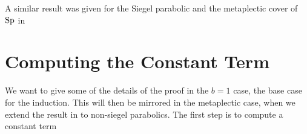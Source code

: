 \begin{Theorem}[]
    
\end{Theorem}

A similar result was given for the Siegel parabolic and the metaplectic cover of \(\operatorname{Sp}\) in \cite{ginzburgTopFourierCoefficients2021}
\begin{Theorem}[]
    
\end{Theorem}

\begin{comment}
    \section{Our Results}
We consider an almost identical setup but we deal with the metaplectic cover of \(\Sp_{2n}\), again over a number field \(F\), \(\Mp_{2n}\)\todo[inline]{reference the section I discuss this in.}. We again fix the Borel of upper triangular matricies, consider partitions of \(n = r+m\) and look at maximal standard parabolics of \(\Sp_{2n}\), \(P_r = M_rN_r\) such that 
\[M_r = \GL_r \times \Sp_{2m}\]
then if \(r = ab\) we still have that \(\Delta(\tau, b)\tensor \sigma\), for \(\tau\) irreducible unitary cuspidal automorphic representation of \(\GL_a\) and \(\sigma\) irreducible generic cuspidal automorphic representation of \(\Sp_{2m}\), is a representation of \(M_r\). The difference is in the parabolic induction as we now consider 
\[\phi\in \mathcal{A}(N_r(\A)M_r(F)\setminus \Mp_{2n}(\A) )_{\Delta(\tau, b)\tensor \sigma}\] 
and then the Eisenstein series is defined in the same way
\[E(\phi, s)(g) = \sum_{\gamma\in P_r(F) \setminus \Sp_{2n}(F)} s.\phi(\gamma g)\]
for \(g\in \Sp_{2n}(F) \setminus \Mp_{2n}(\A)\) and \(s\in \C \cong X^{\Mp_{2n}}_{M_r}\).

\begin{Lemma}
When \(b = 1\) we have the constant term
    \[E(\phi,s)(g)_{P_a} = \phi(g)_{P_a} + M(\omega, \tau\tensor\sigma)(\phi)(g)\]
\end{Lemma}

\todo[inline]{fill in here as theorems or whatever anything that I end up actually checking....}

\end{comment}


\section{Computing the Constant Term}
We want to give some of the details of the proof in the \(b=1\) case, the base case for the induction. This will then be mirrored in the metaplectic case, when we extend the result in \cite{ginzburgTopFourierCoefficients2021} to non-siegel parabolics. The first step is to compute a constant term


